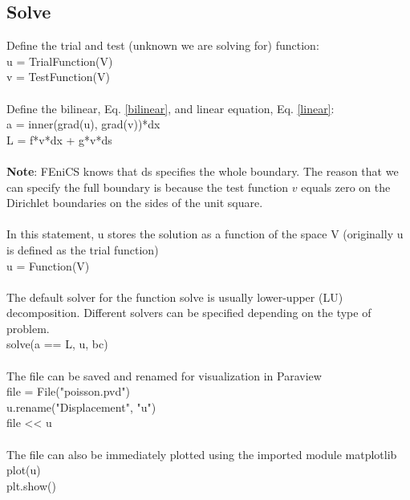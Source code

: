 \documentclass[12pt,3p]{article}
\begin{document}
\subsection{Solve}
Define the trial and test (unknown we are solving for) function: \\
{\selectfont
u = TrialFunction(V) \\
v = TestFunction(V) \\ \\
}
Define the bilinear, Eq. \ref{bilinear}, and linear equation, Eq. \ref{linear}: \\
{\selectfont
a = inner(grad(u), grad(v))*dx \\
L = f*v*dx + g*v*ds \\ \\
}
\textbf{Note}: FEniCS knows that {\selectfont ds} specifies the whole boundary. The reason that we can specify the full boundary is because the test function $v$ equals zero on the Dirichlet boundaries on the sides of the unit square. \\ \\
In this statement, u stores the solution as a function of the space V (originally u is defined as the trial function) \\
{\selectfont
u = Function(V) \\ \\
}
The default solver for the function solve is usually lower-upper (LU) decomposition. Different solvers can be specified depending on the type of problem. \\
{\selectfont
solve(a == L, u, bc) \\ \\
}
The file can be saved and renamed for visualization in Paraview \\
{\selectfont
file = File("poisson.pvd") \\
u.rename("Displacement", "u") \\
file << u \\ \\
} 
The file can also be immediately plotted using the imported module matplotlib \\
{\selectfont
plot(u) \\ 
plt.show() \\ \\
}
\end{document}
